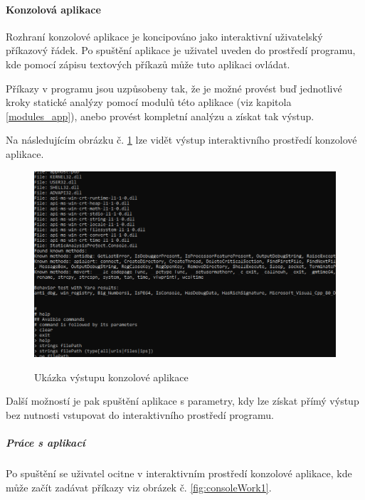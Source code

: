 \paragraph*{Konzolová aplikace}

Rozhraní konzolové aplikace je koncipováno jako interaktivní uživatelský příkazový řádek. Po spuštění aplikace je uživatel uveden do prostředí programu, kde pomocí zápisu textových příkazů může tuto aplikaci ovládat.

Příkazy v programu jsou uzpůsobeny tak, že je možné provést buď jednotlivé kroky statické analýzy pomocí modulů této aplikace (viz kapitola \ref{modules_app}), anebo provést kompletní analýzu a získat tak výstup.

Na následujícím obrázku č. \ref{fig:consoleAppResult} lze vidět výstup interaktivního prostředí konzolové aplikace.

\begin{figure}[H]
    \caption{Ukázka výstupu konzolové aplikace}
    \centering
    \includegraphics[width=160mm,scale=0.5]{Figures/obrazky/konzole.png}
    \label{fig:consoleAppResult}
\end{figure}

Další možností je pak spuštění aplikace s parametry, kdy lze získat přímý výstup bez nutnosti vstupovat do interaktivního prostředí programu.

\subparagraph*{Práce s aplikací}

Po spuštění se uživatel ocitne v interaktivním prostředí konzolové aplikace, kde může začít zadávat příkazy viz obrázek č. \ref{fig:consoleWork1}.

